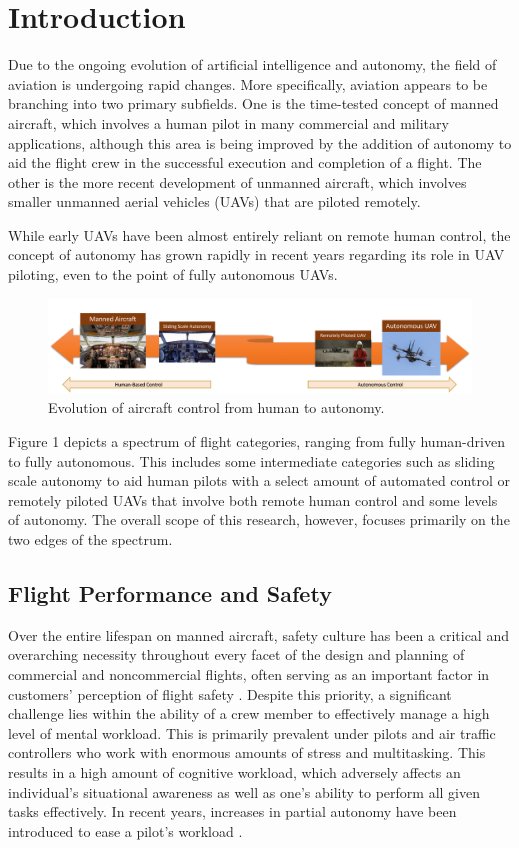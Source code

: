\documentclass[12pt]{uthesis-v12}  %
\begin{document}

\chapter{Introduction}

Due to the ongoing evolution of artificial intelligence and autonomy, the field of aviation is undergoing rapid changes. More specifically, aviation appears to be branching into two primary subfields. One is the time-tested concept of manned aircraft, which involves a human pilot in many commercial and military applications, although this area is being improved by the addition of autonomy to aid the flight crew in the successful execution and completion of a flight. The other is the more recent development of unmanned aircraft, which involves smaller unmanned aerial vehicles (UAVs) that are piloted remotely. 

While early UAVs have been almost entirely reliant on remote human control, the concept of autonomy has grown rapidly in recent years regarding its role in UAV piloting, even to the point of fully autonomous UAVs.
\begin{figure}[!t]
\centering
\includegraphics[width=6in]{overview}
\caption{Evolution of aircraft control from human to autonomy.}
\label{overview}
\end{figure}
Figure 1 depicts a spectrum of flight categories, ranging from fully human-driven to fully autonomous. This includes some intermediate categories such as sliding scale autonomy \cite{paras} to aid human pilots with a select amount of automated control or remotely piloted UAVs that involve both remote human control and some levels of autonomy. The overall scope of this research, however, focuses primarily on the two edges of the spectrum.

\section{Flight Performance and Safety}

Over the entire lifespan on manned aircraft, safety culture \cite{gibbons, boschert, remawi} has been a critical and overarching necessity throughout every facet of the design and planning of commercial and noncommercial flights, often serving as an important factor in customers' perception of flight safety \cite{brown, chang}. Despite this priority, a significant challenge lies within the ability of a crew member to effectively manage a high level of mental workload. This is primarily prevalent under pilots and air traffic controllers who work with enormous amounts of stress and multitasking. This results in a high amount of cognitive workload, which adversely affects an individual's situational awareness as well as one's ability to perform all given tasks effectively. In recent years, increases in partial autonomy have been introduced to ease a pilot's workload \cite{sherman}. 
\end{document}
